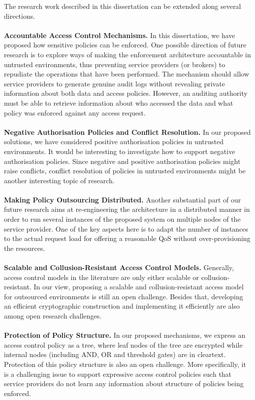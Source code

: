 \documentclass[epsfig,a4paper,11pt,titlepage]{book}
\numberwithin{algorithm}{chapter}
\begin{document}
The research work described in this dissertation can be extended along several directions. \\ \\
\noindent \textbf{Accountable Access Control Mechanisms.}
In this dissertation, we have proposed how sensitive policies can be enforced. One possible direction of future research is to explore ways of making the enforcement architecture accountable in untrusted environments, thus preventing service providers (or brokers) to repudiate the operations that have been performed. The mechanism should allow service providers to generate genuine audit logs without revealing private information about both data and access policies. However, an auditing authority must be able to retrieve information about who accessed the data and what policy was enforced against any access request. \\ \\
\noindent \textbf{Negative Authorisation Policies and Conflict Resolution.}
In our proposed solutions, we have considered positive authorisation policies in untrusted environments. It would be interesting to investigate how to support negative authorisation policies. Since negative and positive authorisation policies might raise conflicts, conflict resolution of policies in untrusted environments might be another interesting topic of research. \\ \\
\noindent \textbf{Making Policy Outsourcing Distributed.}
Another substantial part of our future research aims at re-engineering the architecture in a distributed manner in order to run several instances of the proposed system on multiple nodes of the service provider. One of the key aspects here is to adapt the number of instances to the actual request load for offering a reasonable \gls{QoS} without over-provisioning the resources. \\ \\
\noindent \textbf{Scalable and Collusion-Resistant Access Control Models.}
Generally, access control models in the literature are only either scalable or collusion-resistant. In our view, proposing a scalable and collusion-resistant access model for outsourced environments is still an open challenge. Besides that, developing an efficient cryptographic construction and implementing it efficiently are also among open research challenges. \\ \\
\noindent \textbf{Protection of Policy Structure.}
In our proposed mechanisms, we express an access control policy as a tree, where leaf nodes of the tree are encrypted while internal nodes (including AND, OR and threshold gates) are in cleartext. Protection of this policy structure is also an open challenge. More specifically, it is a challenging issue to support expressive access control policies such that service providers do not learn any information about structure of policies being enforced. \\ \\
\end{document}
